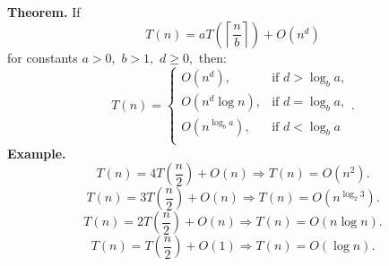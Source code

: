 \documentclass[a4paper]{article}
\author{Nguyễn Văn Lộc}
\begin{document}
\textbf{Theorem.} If
$$T\left( n \right) = aT\left( {\left\lceil {\frac{n}{b}} \right\rceil } \right) + O\left( {{n^d}} \right)$$
for constants $a >0,$ $b > 1,$ $d \geqslant 0,$ then:
$$
T(n) = 
\begin{cases}
O \left( {n^d} \right), & \text{if } d > \log _b a,\\
O \left( {{n^d}\log n} \right), & \text{if } d = \log _b a,\\
O \left( {n^{\log _b a}} \right), & \text{if } d < \log _b a\\
\end{cases}
.
$$
\textbf{Example.}
$$T\left( n \right) = 4T\left( {\frac{n}{2}} \right) + O\left( n \right) \Rightarrow T\left( n \right) = O\left( {{n^2}} \right).$$
$$T\left( n \right) = 3T\left( {\frac{n}{2}} \right) + O\left( n \right) \Rightarrow T\left( n \right) = O\left( {{n^{{{\log }_2}3}}} \right).$$
$$T\left( n \right) = 2T\left( {\frac{n}{2}} \right) + O\left( n \right) \Rightarrow T\left( n \right) = O\left( {n\log n} \right).$$
$$T\left( n \right) = T\left( {\frac{n}{2}} \right) + O\left( 1 \right) \Rightarrow T\left( n \right) = O\left( {\log n} \right).$$
\end{document}
